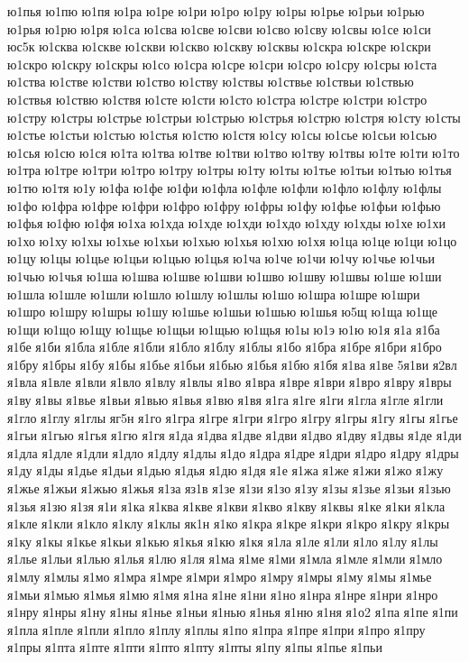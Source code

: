 {ю1пья
ю1пю
ю1пя
ю1ра
ю1ре
ю1ри
ю1ро
ю1ру
ю1ры
ю1рье
ю1рьи
ю1рью
ю1рья
ю1рю
ю1ря
ю1са
ю1сва
ю1све
ю1сви
ю1сво
ю1сву
ю1свы
ю1се
ю1си
юс5к
ю1сква
ю1скве
ю1скви
ю1скво
ю1скву
ю1сквы
ю1скра
ю1скре
ю1скри
ю1скро
ю1скру
ю1скры
ю1со
ю1сра
ю1сре
ю1сри
ю1сро
ю1сру
ю1сры
ю1ста
ю1ства
ю1стве
ю1стви
ю1ство
ю1ству
ю1ствы
ю1ствье
ю1ствьи
ю1ствью
ю1ствья
ю1ствю
ю1ствя
ю1сте
ю1сти
ю1сто
ю1стра
ю1стре
ю1стри
ю1стро
ю1стру
ю1стры
ю1стрье
ю1стрьи
ю1стрью
ю1стрья
ю1стрю
ю1стря
ю1сту
ю1сты
ю1стье
ю1стьи
ю1стью
ю1стья
ю1стю
ю1стя
ю1су
ю1сы
ю1сье
ю1сьи
ю1сью
ю1сья
ю1сю
ю1ся
ю1та
ю1тва
ю1тве
ю1тви
ю1тво
ю1тву
ю1твы
ю1те
ю1ти
ю1то
ю1тра
ю1тре
ю1три
ю1тро
ю1тру
ю1тры
ю1ту
ю1ты
ю1тье
ю1тьи
ю1тью
ю1тья
ю1тю
ю1тя
ю1у
ю1фа
ю1фе
ю1фи
ю1фла
ю1фле
ю1фли
ю1фло
ю1флу
ю1флы
ю1фо
ю1фра
ю1фре
ю1фри
ю1фро
ю1фру
ю1фры
ю1фу
ю1фье
ю1фьи
ю1фью
ю1фья
ю1фю
ю1фя
ю1ха
ю1хда
ю1хде
ю1хди
ю1хдо
ю1хду
ю1хды
ю1хе
ю1хи
ю1хо
ю1ху
ю1хы
ю1хье
ю1хьи
ю1хью
ю1хья
ю1хю
ю1хя
ю1ца
ю1це
ю1ци
ю1цо
ю1цу
ю1цы
ю1цье
ю1цьи
ю1цью
ю1цья
ю1ча
ю1че
ю1чи
ю1чу
ю1чье
ю1чьи
ю1чью
ю1чья
ю1ша
ю1шва
ю1шве
ю1шви
ю1шво
ю1шву
ю1швы
ю1ше
ю1ши
ю1шла
ю1шле
ю1шли
ю1шло
ю1шлу
ю1шлы
ю1шо
ю1шра
ю1шре
ю1шри
ю1шро
ю1шру
ю1шры
ю1шу
ю1шье
ю1шьи
ю1шью
ю1шья
ю5щ
ю1ща
ю1ще
ю1щи
ю1що
ю1щу
ю1щье
ю1щьи
ю1щью
ю1щья
ю1ы
ю1э
ю1ю
ю1я
я1а
я1ба
я1бе
я1би
я1бла
я1бле
я1бли
я1бло
я1блу
я1блы
я1бо
я1бра
я1бре
я1бри
я1бро
я1бру
я1бры
я1бу
я1бы
я1бье
я1бьи
я1бью
я1бья
я1бю
я1бя
я1ва
я1ве
5я1ви
я2вл
я1вла
я1вле
я1вли
я1вло
я1влу
я1влы
я1во
я1вра
я1вре
я1ври
я1вро
я1вру
я1вры
я1ву
я1вы
я1вье
я1вьи
я1вью
я1вья
я1вю
я1вя
я1га
я1ге
я1ги
я1гла
я1гле
я1гли
я1гло
я1глу
я1глы
яг5н
я1го
я1гра
я1гре
я1гри
я1гро
я1гру
я1гры
я1гу
я1гы
я1гье
я1гьи
я1гью
я1гья
я1гю
я1гя
я1да
я1два
я1две
я1дви
я1дво
я1дву
я1двы
я1де
я1ди
я1дла
я1дле
я1дли
я1дло
я1длу
я1длы
я1до
я1дра
я1дре
я1дри
я1дро
я1дру
я1дры
я1ду
я1ды
я1дье
я1дьи
я1дью
я1дья
я1дю
я1дя
я1е
я1жа
я1же
я1жи
я1жо
я1жу
я1жье
я1жьи
я1жью
я1жья
я1за
яз1в
я1зе
я1зи
я1зо
я1зу
я1зы
я1зье
я1зьи
я1зью
я1зья
я1зю
я1зя
я1и
я1ка
я1ква
я1кве
я1кви
я1кво
я1кву
я1квы
я1ке
я1ки
я1кла
я1кле
я1кли
я1кло
я1клу
я1клы
як1н
я1ко
я1кра
я1кре
я1кри
я1кро
я1кру
я1кры
я1ку
я1кы
я1кье
я1кьи
я1кью
я1кья
я1кю
я1кя
я1ла
я1ле
я1ли
я1ло
я1лу
я1лы
я1лье
я1льи
я1лью
я1лья
я1лю
я1ля
я1ма
я1ме
я1ми
я1мла
я1мле
я1мли
я1мло
я1млу
я1млы
я1мо
я1мра
я1мре
я1мри
я1мро
я1мру
я1мры
я1му
я1мы
я1мье
я1мьи
я1мью
я1мья
я1мю
я1мя
я1на
я1не
я1ни
я1но
я1нра
я1нре
я1нри
я1нро
я1нру
я1нры
я1ну
я1ны
я1нье
я1ньи
я1нью
я1нья
я1ню
я1ня
я1о2
я1па
я1пе
я1пи
я1пла
я1пле
я1пли
я1пло
я1плу
я1плы
я1по
я1пра
я1пре
я1при
я1про
я1пру
я1пры
я1пта
я1пте
я1пти
я1пто
я1пту
я1пты
я1пу
я1пы
я1пье
я1пьи
}
